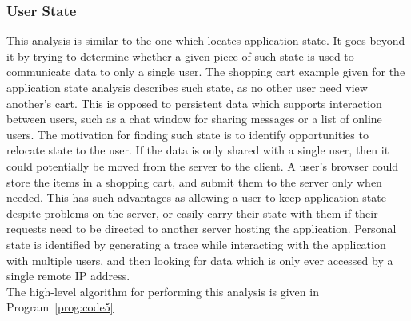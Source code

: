 \documentclass[msc,oneside]{ubcthesis}
\begin{document}
\subsubsection{User State}
This analysis is similar to the one which locates application state. It goes beyond it by trying to determine whether a given piece of such state is used to communicate data to only a single user. The shopping cart example given for the application state analysis describes such state, as no other user need view another's cart. This is opposed to persistent data which supports interaction between users, such as a chat window for sharing messages or a list of online users. The motivation for finding such state is to identify opportunities to relocate state to the user. If the data is only shared with a single user, then it could potentially be moved from the server to the client. A user's browser could store the items in a shopping cart, and submit them to the server only when needed. This has such advantages as allowing a user to keep application state despite problems on the server, or easily carry their state with them if their requests need to be directed to another server hosting the application. Personal state is identified by generating a trace while interacting with the application with multiple users, and then looking for data which is only ever accessed by a single remote IP address.\\

The high-level algorithm for performing this analysis is given in Program~\ref{prog:code5}
\end{document}
